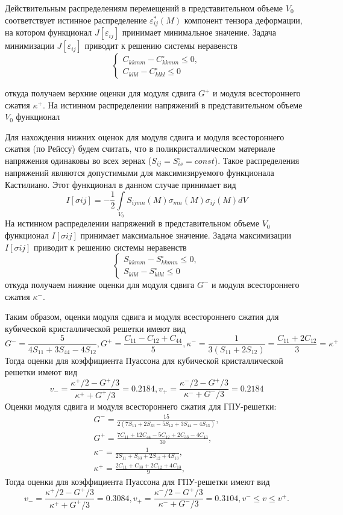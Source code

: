\documentclass[12pt, a4paper]{article}
\begin{document}
Действительным распределениям перемещений в представительном объеме $V_0$ соответствует истинное распределение $\varepsilon_{ij}^{*} (M)$ компонент тензора деформации, на котором функционал $J[\varepsilon_{ij}]$ принимает минимальное значение.
Задача минимизации $J[\varepsilon_{ij}]$ приводит к решению системы неравенств
\[
\begin{cases}
	C_{kkmm} - C_{kkmm}^{\circ} \leq 0,\\
	C_{klkl} - C_{klkl}^{\circ} \leq 0
\end{cases}
\]

откуда получаем верхние оценки для модуля сдвига $G^+$ и модуля всестороннего сжатия $\kappa^+$.
На истинном распределении напряжений в представительном объеме $V_0$ функционал

Для нахождения нижних оценок для модуля сдвига и модуля всестороннего сжатия (по Рейссу) будем считать, что в поликристаллическом материале напряжения одинаковы во всех зернах ($S_{ij} = S_{is}^{\circ} = const$). Такое распределения напряжений являются допустимыми для максимизируемого функционала Кастилиано. Этот функционал в данном случае принимает вид
\[
I[\sigma i j] = - \frac{1}{2} \int \limits_{V_0} {S_{ijmn} (M) \sigma_{mn} (M) \sigma_{ij} (M) dV}
\]
На истинном распределении напряжений в представительном объеме $V_0$ функционал $I[\sigma i j]$ принимает максимальное значение.
Задача максимизации $I[\sigma i j]$ приводит к решению системы неравенств
\[
\begin{cases}
	S_{kkmm} - S_{kkmm}^{\circ} \leq 0,\\
	S_{klkl} - S_{klkl}^{\circ} \leq 0
\end{cases}
\]
откуда получаем нижние оценки для модуля сдвига $G^{-}$ и модуля всестороннего сжатия $\kappa^{-}$.

Таким образом, оценки модуля сдвига и модуля всестороннего сжатия для кубической кристаллической решетки имеют вид
\[
G^{-} = \frac{5}{4 S_{11} + 3 S_{44} - 4 S_{12}},
G^{+} = \frac{C_{11} - C_{12} + C_{44}}{5},
\kappa^{-} = \frac{1}{3 (S_{11} + 2 S_{12})} = \frac{C_{11} + 2 C_{12}}{3} = \kappa^{+}
\]
Тогда оценки для коэффициента Пуассона для кубической кристаллической решетки
имеют вид
\[
v_{-} = \frac{\kappa^{+} / 2 - G^{+} / 3}{\kappa^{+} + G^{+} / 3} = 0.2184,
v_{+} = \frac{\kappa^{-} / 2 - G^{+} / 3}{\kappa^{-} + G^{-} / 3} = 0.2184
\]
Оценки модуля сдвига и модуля всестороннего сжатия для ГПУ-решетки:
\begin{gather*}
	G^{-} = \frac{15}{2(7 S_{11} + 2 S_{33} - 5 S_{12} + 3 S_{44} - 4 S_{13})},\\
	G^{+} = \frac{7 C_{11} + 12 C_{44} - 5 C_{12} + 2 C_{33} - 4 C_{13}}{30},\\
	\kappa^{-} = \frac{1}{2 S_{11} + S_{33} + 2 S_{12} + 4 S_{13}},\\
	\kappa^{+} = \frac{2 C_{11} + C_{33} + 2 C_{12} + 4 C_{13}}{9},
\end{gather*}
Тогда оценки для коэффициента Пуассона для ГПУ-решетки имеют вид
\[
v_{-} = \frac{\kappa^{+} / 2 - G^{+} / 3}{\kappa^{+} + G^{+} / 3} = 0.3084,
v_{+} = \frac{\kappa^{-} / 2 - G^{+} / 3}{\kappa^{-} + G^{-} / 3} = 0.3104,
v^{-} \leq v \leq v^{+}.
\]
\end{document}
